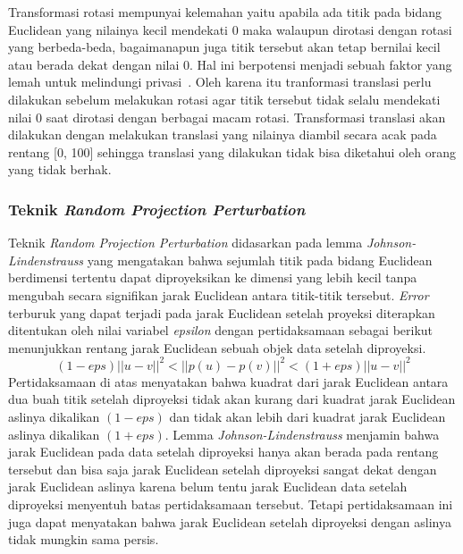 Transformasi rotasi mempunyai kelemahan yaitu apabila ada titik pada bidang Euclidean yang nilainya kecil mendekati 0 maka walaupun dirotasi dengan rotasi yang berbeda-beda, bagaimanapun juga titik tersebut akan tetap bernilai kecil atau berada dekat dengan nilai 0. Hal ini berpotensi menjadi sebuah faktor yang lemah untuk melindungi privasi~\cite{rotation:05:chenliu}. Oleh karena itu tranformasi translasi perlu dilakukan sebelum melakukan rotasi agar titik tersebut tidak selalu mendekati nilai 0 saat dirotasi dengan berbagai macam rotasi. Transformasi translasi akan dilakukan dengan melakukan translasi yang nilainya diambil secara acak pada rentang [0, 100] sehingga translasi yang dilakukan tidak bisa diketahui oleh orang yang tidak berhak.

\subsubsection{Teknik \textit{Random Projection Perturbation}}
\label{subsubsec:analisis-projection}

Teknik \textit{Random Projection Perturbation} didasarkan pada lemma \textit{Johnson-Lindenstrauss} yang mengatakan bahwa sejumlah titik pada bidang Euclidean berdimensi tertentu dapat diproyeksikan ke dimensi yang lebih kecil tanpa mengubah secara signifikan jarak Euclidean antara titik-titik tersebut. \textit{Error} terburuk yang dapat terjadi pada jarak Euclidean setelah proyeksi diterapkan ditentukan oleh nilai variabel \textit{epsilon} dengan pertidaksamaan sebagai berikut menunjukkan rentang jarak Euclidean sebuah objek data setelah diproyeksi.
\begin{equation}
	(1-eps)||u - v||^{2}<||p(u) - p(v)||^{2}<(1+eps)||u - v||^{2}
\end{equation}
Pertidaksamaan di atas menyatakan bahwa kuadrat dari jarak Euclidean antara dua buah titik setelah diproyeksi tidak akan kurang dari kuadrat jarak Euclidean aslinya dikalikan \((1-eps)\) dan tidak akan lebih dari kuadrat jarak Euclidean aslinya dikalikan \((1+eps)\). Lemma \textit{Johnson-Lindenstrauss} menjamin bahwa jarak Euclidean pada data setelah diproyeksi hanya akan berada pada rentang tersebut dan bisa saja jarak Euclidean setelah diproyeksi sangat dekat dengan jarak Euclidean aslinya karena belum tentu jarak Euclidean data setelah diproyeksi menyentuh batas pertidaksamaan tersebut. Tetapi pertidaksamaan ini juga dapat menyatakan bahwa jarak Euclidean setelah diproyeksi dengan aslinya tidak mungkin sama persis.

